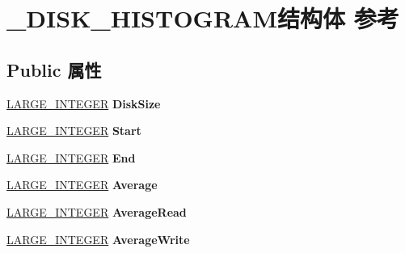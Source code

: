 \hypertarget{struct___d_i_s_k___h_i_s_t_o_g_r_a_m}{}\section{\+\_\+\+D\+I\+S\+K\+\_\+\+H\+I\+S\+T\+O\+G\+R\+A\+M结构体 参考}
\label{struct___d_i_s_k___h_i_s_t_o_g_r_a_m}
\subsection*{Public 属性}
\begin{DoxyCompactItemize}
\item 
\mbox{\label{struct___d_i_s_k___h_i_s_t_o_g_r_a_m_ad9085b679d1b5d8bb97bd672c143714e}} 
\hyperlink{union___l_a_r_g_e___i_n_t_e_g_e_r}{L\+A\+R\+G\+E\+\_\+\+I\+N\+T\+E\+G\+ER} {\bfseries Disk\+Size}
\item 
\mbox{\label{struct___d_i_s_k___h_i_s_t_o_g_r_a_m_a592d2f917c01c89acc6be847e5505c88}} 
\hyperlink{union___l_a_r_g_e___i_n_t_e_g_e_r}{L\+A\+R\+G\+E\+\_\+\+I\+N\+T\+E\+G\+ER} {\bfseries Start}
\item 
\mbox{\label{struct___d_i_s_k___h_i_s_t_o_g_r_a_m_aa3e69b35c0605e19746effd67206b517}} 
\hyperlink{union___l_a_r_g_e___i_n_t_e_g_e_r}{L\+A\+R\+G\+E\+\_\+\+I\+N\+T\+E\+G\+ER} {\bfseries End}
\item 
\mbox{\label{struct___d_i_s_k___h_i_s_t_o_g_r_a_m_afcc4d212d7d1e8cc78616dab566ac5a6}} 
\hyperlink{union___l_a_r_g_e___i_n_t_e_g_e_r}{L\+A\+R\+G\+E\+\_\+\+I\+N\+T\+E\+G\+ER} {\bfseries Average}
\item 
\mbox{\label{struct___d_i_s_k___h_i_s_t_o_g_r_a_m_aea82405bf7c20dfd046ea1ad6b08f378}} 
\hyperlink{union___l_a_r_g_e___i_n_t_e_g_e_r}{L\+A\+R\+G\+E\+\_\+\+I\+N\+T\+E\+G\+ER} {\bfseries Average\+Read}
\item 
\mbox{\label{struct___d_i_s_k___h_i_s_t_o_g_r_a_m_a16bb925be547b1ed20664fc45f21643f}} 
\hyperlink{union___l_a_r_g_e___i_n_t_e_g_e_r}{L\+A\+R\+G\+E\+\_\+\+I\+N\+T\+E\+G\+ER} {\bfseries Average\+Write}

\end{DoxyCompactItemize}
